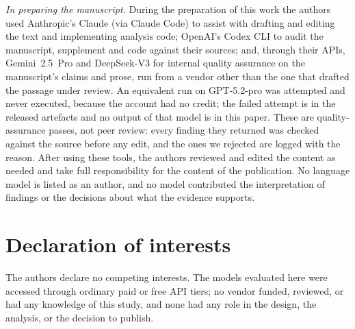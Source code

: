 \documentclass[review,authoryear,12pt]{elsarticle}
\begin{document}
\emph{In preparing the manuscript.} During the preparation of this work the
authors used Anthropic's Claude (via Claude Code) to assist with drafting and
editing the text and implementing analysis code; OpenAI's Codex CLI to audit
the manuscript, supplement and code against their sources; and, through their
APIs, Gemini~2.5~Pro and DeepSeek-V3 for internal quality assurance on the
manuscript's claims and prose, run from a vendor other than the one that drafted
the passage under review. An equivalent run on GPT-5.2-pro was attempted and
never executed, because the account had no credit; the failed attempt is in the
released artefacts and no output of that model is in this paper. These are
quality-assurance passes, not peer review: every finding they returned was
checked against the source before any edit, and the ones we rejected are logged
with the reason. After using these tools, the authors reviewed and edited the content as needed and take full
responsibility for the content of the publication. No language model is listed as
an author, and no model contributed the interpretation of findings or the
decisions about what the evidence supports.

\section*{Declaration of interests}

The authors declare no competing interests. The models evaluated here were
accessed through ordinary paid or free API tiers; no vendor funded, reviewed, or
had any knowledge of this study, and none had any role in the design, the
analysis, or the decision to publish.



\end{document}
